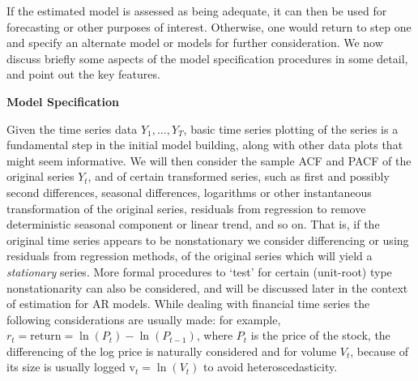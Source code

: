 If the estimated model is assessed as being adequate, it can then be used for forecasting or other purposes of interest. Otherwise, one would return to step one and specify an alternate model or models for further consideration. We now discuss briefly some aspects of the model specification procedures in some detail, and point out the key features. \twomedskip


\noindent\textbf{Model Specification} \twomedskip


Given the time series data $Y_1, \ldots, Y_T$, basic time series  plotting of the series is a fundamental step in the initial model building, along with other data plots that might seem informative. We will then consider the sample ACF and PACF of the original series $Y_t$, and of certain transformed series, such as first and possibly second differences, seasonal differences, logarithms or other instantaneous transformation of the original series, residuals from regression to remove deterministic seasonal component or linear trend, and so on. That is, if the original time series appears to be nonstationary we consider differencing or using residuals from regression methods, of the original series which will yield a \emph{stationary} series. More formal procedures to `test' for certain (unit-root) type nonstationarity can also be considered, and will be discussed later in the context of estimation for AR models.  While dealing with financial time series the following considerations are usually made: for example, $r_t= \text{return} = \ln(P_t) - \ln(P_{t-1})$, where $P_t$ is the price of the stock, the differencing of the log price is naturally considered and for volume $V_t$, because of its size is usually logged $\text{v}_t= \ln(V_t)$ to avoid heteroscedasticity.


